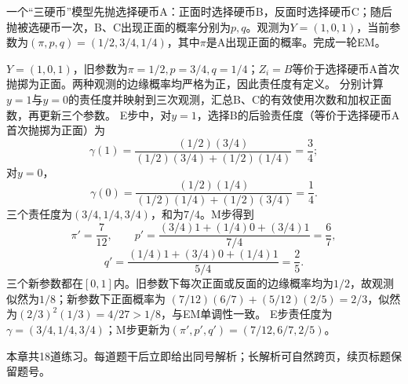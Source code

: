 \label{struct:V3-C04-CH32}
\begin{example}[三硬币模型的一轮EM]\label{exm:V3-C04-three-coins-one-round}
一个“三硬币”模型先抛选择硬币A：正面时选择硬币B，反面时选择硬币C；随后抛被选硬币一次，B、C出现正面的概率分别为$p,q$。观测为$Y=(1,0,1)$，当前参数为$(\pi,p,q)=(1/2,3/4,1/4)$，其中$\pi$是A出现正面的概率。完成一轮EM。

\label{struct:V3-C04-CH33}
\end{example}
\begin{solution}
\SolGiven $Y=(1,0,1)$，旧参数为$\pi=1/2,p=3/4,q=1/4$；$Z_i=B$等价于选择硬币A首次抛掷为正面。两种观测的边缘概率均严格为正，因此责任度有定义。
\SolPlan 分别计算$y=1$与$y=0$的责任度并映射到三次观测，汇总B、C的有效使用次数和加权正面数，再更新三个参数。
\SolDerive
E步中，对$y=1$，选择B的后验责任度（等价于选择硬币A首次抛掷为正面）为
\[
\gamma(1)=\frac{(1/2)(3/4)}{(1/2)(3/4)+(1/2)(1/4)}=\frac34;
\]
对$y=0$，
\[
\gamma(0)=\frac{(1/2)(1/4)}{(1/2)(1/4)+(1/2)(3/4)}=\frac14.
\]
三个责任度为$(3/4,1/4,3/4)$，和为$7/4$。M步得到
\[
\pi'=\frac{7}{12},\qquad
p'=\frac{(3/4)1+(1/4)0+(3/4)1}{7/4}=\frac67,
\]
\[
q'=\frac{(1/4)1+(3/4)0+(1/4)1}{5/4}=\frac25.
\]
\SolCheck 三个新参数都在$[0,1]$内。旧参数下每次正面或反面的边缘概率均为$1/2$，故观测似然为$1/8$；新参数下正面概率为
$(7/12)(6/7)+(5/12)(2/5)=2/3$，似然为$(2/3)^2(1/3)=4/27>1/8$，与EM单调性一致。
\SolAnswer E步责任度为$\gamma=(3/4,1/4,3/4)$；M步更新为$(\pi',p',q')=(7/12,6/7,2/5)$。
\end{solution}


\label{struct:V3-C04-CH34}
\begin{chapterexercisebox}
\label{struct:V3-C04-CH35}
本章共18道练习。每道题干后立即给出同号解析；长解析可自然跨页，续页标题保留题号。
\end{chapterexercisebox}

